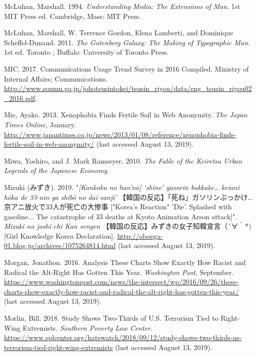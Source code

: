 \documentclass[10pt,british,A4paper,twoside]{memoir}
\begin{document}
\hypertarget{ref-mcluhan_understanding_1994}{}
McLuhan, Marshall. 1994. \emph{Understanding Media: The Extensions of
Man}. 1st MIT Press ed. Cambridge, Mass: MIT Press.

\hypertarget{ref-mcluhan_gutenberg_2011}{}
McLuhan, Marshall, W. Terrence Gordon, Elena Lamberti, and Dominique
Scheffel-Dunand. 2011. \emph{The Gutenberg Galaxy: The Making of
Typographic Man}. 1st ed. Toronto ; Buffalo: University of Toronto
Press.

\hypertarget{ref-mic_communications_2017}{}
MIC. 2017. Communications Usage Trend Survey in 2016 Compiled. Ministry
of Internal Affairs; Communications.
\url{http://www.soumu.go.jp/johotsusintokei/tsusin_riyou/data/eng_tsusin_riyou02_2016.pdf}.

\hypertarget{ref-mie_xenophobia_2013}{}
Mie, Ayako. 2013. Xenophobia Finds Fertile Soil in Web Anonymity.
\emph{The Japan Times Online}, January.
\url{http://www.japantimes.co.jp/news/2013/01/08/reference/xenophobia-finds-fertile-soil-in-web-anonymity/} (last accessed August 13, 2019).

\hypertarget{ref-miwa_fable_2010}{}
Miwa, Yoshiro, and J. Mark Ramseyer. 2010. \emph{The Fable of the
Keiretsu Urban Legends of the Japanese Economy}.

\hypertarget{ref-mizuki_eng._2019}{}
Mizuki (みずき). 2019. "\emph{[Kankoku no han'nō] `shine' gasorin bukkake… keiani hōka de 33-nin ga shibō no dai sanji'} 【韓国の反応】「死ね」ガソリンぶっかけ…京アニ放火で33人が死亡の大惨事 ["Korea's Reaction" 'Die'. Splashed with gasoline... The catastrophe of 33 deaths at Kyoto Animation Arson attack]". \emph{Mizuki no joshi chi Kan sengen} 【韓国の反応】みずきの女子知韓宣言（´∀｀*) [Girl Knowledge Korea Declaration]. \url{http://oboega-01.blog.jp/archives/1075264814.html} (last accessed August 13, 2019).

\hypertarget{ref-morgan_analysis_2016}{}
Morgan, Jonathon. 2016. Analysis These Charts Show Exactly How Racist
and Radical the Alt-Right Has Gotten This Year. \emph{Washington Post},
September.
\url{https://www.washingtonpost.com/news/the-intersect/wp/2016/09/26/these-charts-show-exactly-how-racist-and-radical-the-alt-right-has-gotten-this-year/} (last accessed August 13, 2019).

\hypertarget{ref-morlin_study_2018}{}
Morlin, Bill. 2018. Study Shows Two-Thirds of U.S. Terrorism Tied to
Right-Wing Extremists. \emph{Southern Poverty Law Center}.
\url{https://www.splcenter.org/hatewatch/2018/09/12/study-shows-two-thirds-us-terrorism-tied-right-wing-extremists} (last accessed August 13, 2019).
\end{document}
